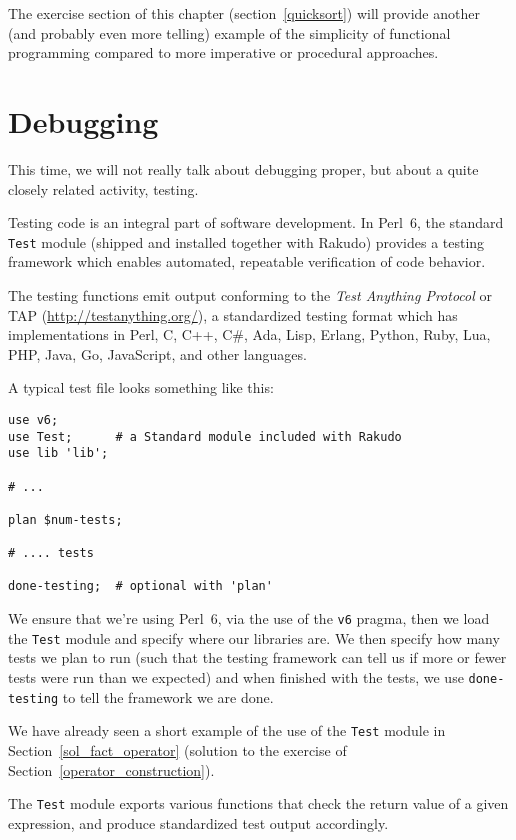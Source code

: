 The exercise section of this chapter (section~\ref{quicksort}) 
will provide another (and probably even more telling) example 
of the simplicity of functional programming compared to more 
imperative or procedural approaches.


\section{Debugging}
\label{test_module}

This time, we will not really talk about debugging proper, 
but about a quite closely related activity, testing.

Testing code is an integral part of software development. In 
Perl~6, the standard {\tt Test} module (shipped and installed 
together with Rakudo) provides a testing framework which enables 
automated, repeatable verification of code behavior.

The testing functions emit output conforming to the \emph{Test 
Anything Protocol} or TAP (\url{http://testanything.org/}), a 
standardized testing format which has implementations in Perl, 
C, C++, C\#, Ada, Lisp, Erlang, Python, Ruby, Lua, PHP, Java, 
Go, JavaScript, and other languages.

A typical test file looks something like this:

\begin{verbatim}
use v6;
use Test;      # a Standard module included with Rakudo
use lib 'lib';

# ...

plan $num-tests;

# .... tests

done-testing;  # optional with 'plan'
\end{verbatim}

We ensure that we're using Perl~6, via the use of the \verb'v6' 
pragma, then we load the \verb'Test' module and specify where 
our libraries are. We then specify how many tests we plan 
to run (such that the testing framework can tell us 
if more or fewer tests were run than we expected) 
and when finished with the tests, we use {\tt done-testing} 
to tell the framework we are done.

We have already seen a short example of the use of the 
\verb'Test' module in Section~\ref{sol_fact_operator} 
(solution to the exercise of 
Section~\ref{operator_construction}).

The \verb'Test' module exports various functions that 
check the return value of a given expression, and produce 
standardized test output accordingly.

